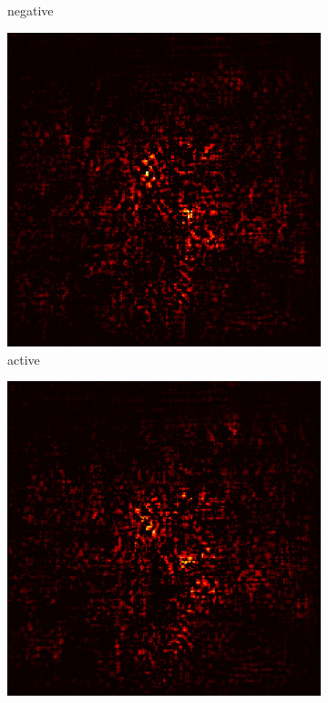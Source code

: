 \documentclass[preprint,12pt]{elsarticle}
\begin{document}
\begin{figure}
\begin{subfigure}{0.14\textwidth}
        \caption{negative}
    \end{subfigure}
    \hfill
    \begin{subfigure}{0.14\textwidth}
        \centering
        \includegraphics[width=\linewidth]{../visualizations/examples/imagenette/resnet18/active_saliency_map/3.png}
        \caption{active}
    \end{subfigure}
    \hfill
    \begin{subfigure}{0.14\textwidth}
        \centering
        \includegraphics[width=\linewidth]{../visualizations/examples/imagenette/resnet18/inactive_saliency_map/3.png}

\end{subfigure}
\end{figure}
\end{document}
